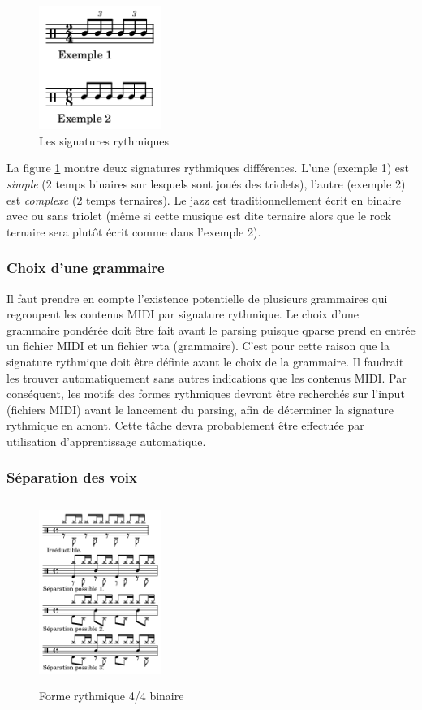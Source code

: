 \begin{figure}[h]
	\centering
	\includegraphics[height=40mm, width=40mm]{
    z_images/3_methodes/2_systemes/0_simple_VS_complexe.png}
	\caption{Les signatures rythmiques}
	\label{subdivisions}
\end{figure} %

La figure \ref{subdivisions} montre deux signatures rythmiques différentes. 
L’une (exemple 1) est \textit{simple} (2 temps binaires sur lesquels sont joués
des triolets), l’autre (exemple 2) est \textit{complexe} (2 temps ternaires). 
Le jazz est traditionnellement écrit en binaire avec ou sans triolet (même si
cette musique est dite ternaire alors que le rock ternaire sera plutôt écrit
comme dans l’exemple 2).

\subsubsection{Choix d’une grammaire}
Il faut prendre en compte l’existence potentielle de plusieurs grammaires
qui regroupent les contenus MIDI par signature rythmique. Le choix d’une
grammaire pondérée doit être fait avant le parsing puisque qparse prend en
entrée un fichier MIDI et un fichier wta (grammaire). C’est pour cette raison
que la signature rythmique doit être définie avant le choix de la grammaire.
Il faudrait les trouver automatiquement sans autres indications que les
contenus MIDI. Par conséquent, les motifs des
formes rythmiques devront être recherchés sur l’input (fichiers MIDI)
avant le lancement du parsing, afin de déterminer la signature rythmique en
amont. Cette tâche devra probablement être effectuée par utilisation
d’apprentissage automatique.


\subsubsection{Séparation des voix}

\label{sys_sep_voix}
\begin{figure}[h]
	\centering
	\includegraphics[height=60mm, width=40mm]{
    z_images/3_methodes/2_systemes/1_separation_4-4_binaire.png}
	\caption{Forme rythmique 4/4 binaire}
	\label{binaire}
\end{figure}


